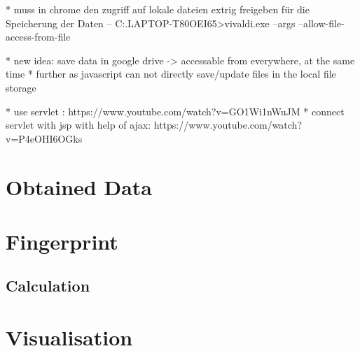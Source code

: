 * muss in chrome den zugriff auf lokale dateien extrig freigeben für die Speicherung der Daten
-- C:\Users\mayer.LAPTOP-T80OEI65\AppData\Local\Vivaldi\Application>vivaldi.exe --args --allow-file-access-from-file

* new idea: save data in google drive -> accessable from everywhere, at the same time
* further as javascript can not directly save/update files in the local file storage

* use servlet : https://www.youtube.com/watch?v=GO1Wi1nWuJM
* connect servlet with jsp with help of ajax: https://www.youtube.com/watch?v=P4eOHI6OGks

\section{Obtained Data}


\section{Fingerprint}

\subsection{Calculation}

\section{Visualisation}